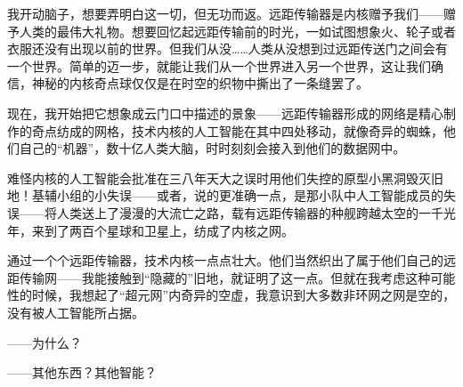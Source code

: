 \documentclass[AutoFakeBold=true]{book}
\begin{document}
{}

\vspace*{1em}

我开动脑子，想要弄明白这一切，但无功而返。远距传输器是内核赠予我们——赠予人类的最伟大礼物。想要回忆起远距传输前的时光，一如试图想象火、轮子或者衣服还没有出现以前的世界。但我们从没……人类从没想到过远距传送门之间会有一个世界。简单的迈一步，就能让我们从一个世界进入另一个世界，这让我们确信，神秘的内核奇点球仅仅是在时空的织物中撕出了一条缝罢了。

现在，我开始把它想象成云门口中描述的景象——远距传输器形成的网络是精心制作的奇点纺成的网格，技术内核的人工智能在其中四处移动，就像奇异的蜘蛛，他们自己的``机器''，数十亿人类大脑，时时刻刻会接入到他们的数据网中。

难怪内核的人工智能会批准在三八年天大之误时用他们失控的原型小黑洞毁灭旧地！基辅小组的小失误——或者，说的更准确一点，是那小队中人工智能成员的失误——将人类送上了漫漫的大流亡之路，载有远距传输器的种舰跨越太空的一千光年，来到了两百个星球和卫星上，纺成了内核之网。

通过一个个远距传输器，技术内核一点点壮大。他们当然织出了属于他们自己的远距传输网——我能接触到``隐藏的''旧地，就证明了这一点。但就在我考虑这种可能性的时候，我想起了``超元网''内奇异的空虚，我意识到大多数非环网之网是空的，没有被人工智能所占据。

{}

{\kaishu ——为什么？}

{}

{\kaishu ——其他东西？其他智能？}

{\heiti [嚇！]}

{}
\end{document}
